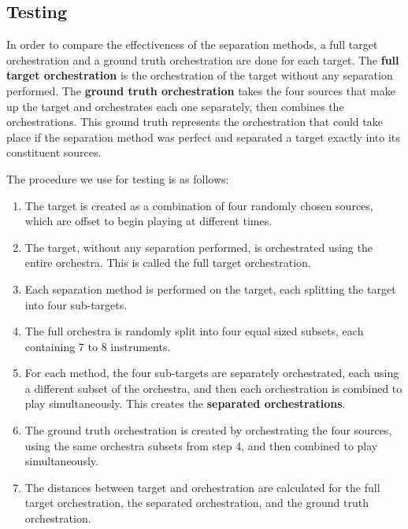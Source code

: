 \documentclass{article}
\begin{document}
    \subsection{Testing}\label{subsec:testing}
    In order to compare the effectiveness of the separation methods, a full target orchestration and a ground truth orchestration are done for each target. The \textbf{full target orchestration} is the orchestration of the target without any separation performed. The \textbf{ground truth orchestration} takes the four sources that make up the target and orchestrates each one separately, then combines the orchestrations. This ground truth represents the orchestration that could take place if the separation method was perfect and separated a target exactly into its constituent sources. 
    
    The procedure we use for testing is as follows:
    \begin{enumerate}
      \item The target is created as a combination of four randomly chosen sources, which are offset to begin playing at different times.
      \item The target, without any separation performed, is orchestrated using the entire orchestra. This is called the full target orchestration.
      \item Each separation method is performed on the target, each splitting the target into four sub-targets. 
      \item The full orchestra is randomly split into four equal sized subsets, each containing 7 to 8 instruments.
      \item For each method, the four sub-targets are separately orchestrated, each using a different subset of the orchestra, and then each orchestration is combined to play simultaneously. This creates the \textbf{separated orchestrations}.
      \item The ground truth orchestration is created by orchestrating the four sources, using the same orchestra subsets from step 4, and then combined to play simultaneously.
      \item The distances between target and orchestration are calculated for the full target orchestration, the separated orchestration, and the ground truth orchestration. 
    \end{enumerate} 
\end{document}
